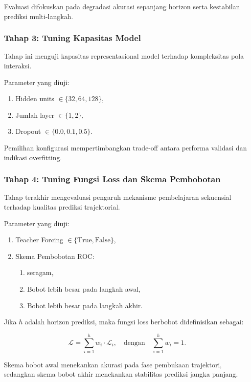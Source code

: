 Evaluasi difokuskan pada degradasi akurasi sepanjang horizon serta kestabilan prediksi multi-langkah.

\subsubsection{Tahap 3: Tuning Kapasitas Model}

Tahap ini menguji kapasitas representasional model terhadap kompleksitas pola interaksi.

Parameter yang diuji:

\begin{enumerate}
    \item Hidden units $\in \{32, 64, 128\}$,
    \item Jumlah layer $\in \{1, 2\}$,
    \item Dropout $\in \{0.0, 0.1, 0.5\}$.
\end{enumerate}

Pemilihan konfigurasi mempertimbangkan trade-off antara performa validasi dan indikasi overfitting.

\subsubsection{Tahap 4: Tuning Fungsi Loss dan Skema Pembobotan}

Tahap terakhir mengevaluasi pengaruh mekanisme pembelajaran sekuensial terhadap kualitas prediksi trajektorial.

Parameter yang diuji:

\begin{enumerate}
    \item Teacher Forcing $\in \{\text{True}, \text{False}\}$,
    \item Skema Pembobotan ROC:
    \begin{enumerate}
        \item seragam,
        \item Bobot lebih besar pada langkah awal,
        \item Bobot lebih besar pada langkah akhir.
    \end{enumerate}
\end{enumerate}

Jika $h$ adalah horizon prediksi, maka fungsi loss berbobot didefinisikan sebagai:

\[
\mathcal{L} =
\sum_{i=1}^{h}
w_i \cdot \mathcal{L}_i,
\quad
\text{dengan}
\quad
\sum_{i=1}^{h} w_i = 1.
\]

Skema bobot awal menekankan akurasi pada fase pembukaan trajektori, sedangkan skema bobot akhir menekankan stabilitas prediksi jangka panjang.


